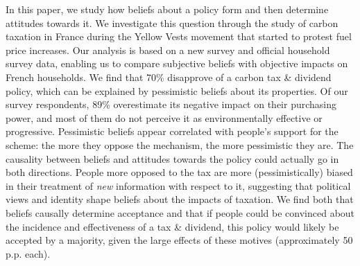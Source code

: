 \documentclass[12pt]{article} %
\begin{document}

In this paper, we study how beliefs about a policy form and then determine attitudes towards it. We investigate this question through the study of carbon taxation in France during the Yellow Vests movement that started to protest fuel price increases. Our analysis is based on a new survey and official household survey data, enabling us to compare subjective beliefs with objective impacts on French households. We find that 70\% disapprove of a carbon tax \& dividend policy, which can be explained by pessimistic beliefs about its properties. Of our survey respondents, 89\% overestimate its negative impact on their purchasing power, and most of them do not perceive it as environmentally effective or progressive. Pessimistic beliefs appear correlated with people's support for the scheme: the more they oppose the mechanism, the more pessimistic they are. The causality between beliefs and attitudes towards the policy could actually go in both directions. People more opposed to the tax are more (pessimistically) biased in their treatment of \textit{new} information with respect to it, suggesting that political views and identity shape beliefs about the impacts of taxation. We find both that beliefs causally determine acceptance and that if people could be convinced about the incidence and effectiveness of a tax \& dividend, this policy would likely be accepted by a majority, given the large effects of these motives (approximately 50 p.p. each).%


\end{document}
